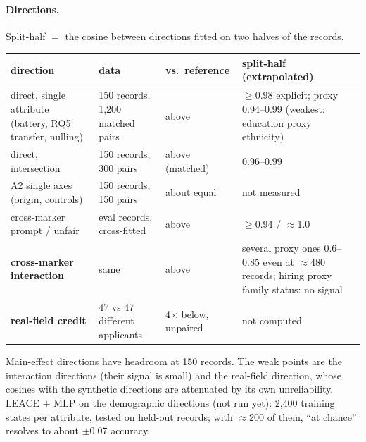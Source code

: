 \documentclass{article}
\begin{document}
\paragraph{Directions.} Split-half $=$ the cosine between directions fitted on two halves of the records.
\begin{center}\small
\begin{tabular}{@{}p{4.1cm}p{3.5cm}p{2.3cm}p{4.9cm}@{}}
direction & data & vs.\ reference & split-half (extrapolated) \\ \hline
direct, single attribute (battery, RQ5 transfer, nulling) & 150 records, 1{,}200 matched pairs & above &
  $\ge$0.98 explicit; proxy 0.94--0.99 (weakest: education proxy ethnicity) \\
direct, intersection & 150 records, 300 pairs & above (matched) & 0.96--0.99 \\
A2 single axes (origin, controls) & 150 records, 150 pairs & about equal & not measured \\
cross-marker prompt / unfair & eval records, cross-fitted & above & $\ge$0.94 / $\approx$1.0 \\
\textbf{cross-marker interaction} & same & above & several proxy ones 0.6--0.85 even at $\approx$480 records;
  hiring proxy family status: no signal \\
\textbf{real-field credit} & 47 vs 47 different applicants & 4$\times$ below, unpaired & not computed \\
\end{tabular}
\end{center}
Main-effect directions have headroom at 150 records. The weak points are the interaction directions (their signal
is small) and the real-field direction, whose cosines with the synthetic directions are attenuated by its own
unreliability. LEACE $+$ MLP on the demographic directions (not run yet): 2{,}400 training states per attribute,
tested on held-out records; with $\approx$200 of them, ``at chance'' resolves to about $\pm$0.07 accuracy.
\end{document}
